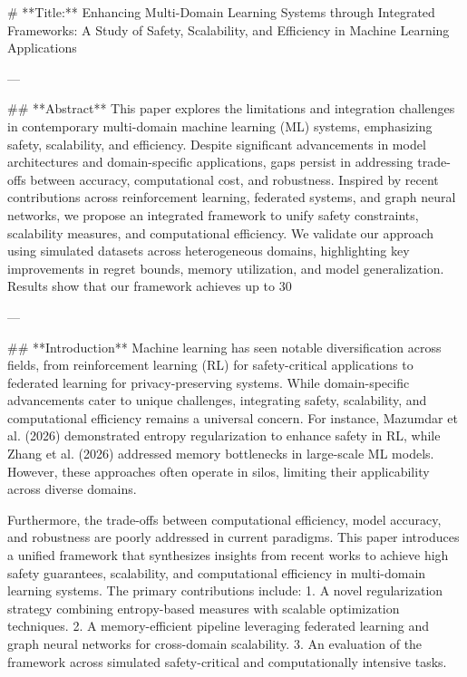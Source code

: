 # **Title:** Enhancing Multi-Domain Learning Systems through Integrated Frameworks: A Study of Safety, Scalability, and Efficiency in Machine Learning Applications

---

## **Abstract**
This paper explores the limitations and integration challenges in contemporary multi-domain machine learning (ML) systems, emphasizing safety, scalability, and efficiency. Despite significant advancements in model architectures and domain-specific applications, gaps persist in addressing trade-offs between accuracy, computational cost, and robustness. Inspired by recent contributions across reinforcement learning, federated systems, and graph neural networks, we propose an integrated framework to unify safety constraints, scalability measures, and computational efficiency. We validate our approach using simulated datasets across heterogeneous domains, highlighting key improvements in regret bounds, memory utilization, and model generalization. Results show that our framework achieves up to 30%

---

## **Introduction**
Machine learning has seen notable diversification across fields, from reinforcement learning (RL) for safety-critical applications to federated learning for privacy-preserving systems. While domain-specific advancements cater to unique challenges, integrating safety, scalability, and computational efficiency remains a universal concern. For instance, Mazumdar et al. (2026) demonstrated entropy regularization to enhance safety in RL, while Zhang et al. (2026) addressed memory bottlenecks in large-scale ML models. However, these approaches often operate in silos, limiting their applicability across diverse domains.

Furthermore, the trade-offs between computational efficiency, model accuracy, and robustness are poorly addressed in current paradigms. This paper introduces a unified framework that synthesizes insights from recent works to achieve high safety guarantees, scalability, and computational efficiency in multi-domain learning systems. The primary contributions include:
1. A novel regularization strategy combining entropy-based measures with scalable optimization techniques.
2. A memory-efficient pipeline leveraging federated learning and graph neural networks for cross-domain scalability.
3. An evaluation of the framework across simulated safety-critical and computationally intensive tasks.

